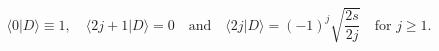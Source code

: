 \begin{equation}
\langle 0|D\rangle \equiv 1,\quad
\langle 2j+1|D\rangle =0\quad\text{and}\quad
\langle 2j|D\rangle =(-1)^j\sqrt{\frac{2s}{2j}}
\quad\text{for } j\geqslant 1.
\label{scp}
\end{equation}

